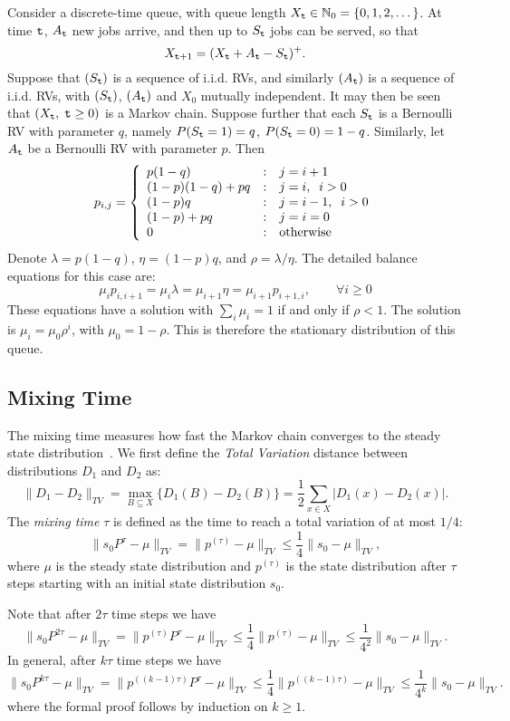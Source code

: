 \begin{example} Consider a discrete-time queue, with queue length $X_{\tt t}\in \mathbb{N}_0=\{0,1,2,\dots\}$. At time  ${\tt t}$, ${A_{\tt t}}$ new jobs arrive, and then up to ${S_{\tt t}}$ jobs can be served, so that
\[{X_{{\tt t} +1}} = {({X_{\tt t}} + {A_{\tt t}} - {S_{\tt t}})^ + }.\]
Suppose that $({S_{\tt t}})$ is a sequence of i.i.d. RVs, and
similarly $({A_{\tt t}})$ is a sequence of i.i.d. RVs, with
$({S_{\tt t}})$, $({A_{\tt t}})$ and ${X_0}$ mutually independent. It
may then be seen that $({X_{\tt t}},\;{\tt t} \ge 0)$ is a Markov chain.
Suppose further that each ${S_{\tt t}}$ is a Bernoulli RV with
parameter $q$, namely $P({S_{\tt t}} = 1) = q$, $P({S_{\tt t}} = 0) =
1 - q$. Similarly, let ${A_{\tt t}}$ be a Bernoulli RV with parameter
$p$. Then
\[{p_{i,j}} = \left\{ {\begin{array}{*{20}{l}}
{p(1 - q)}&:&{j = i + 1}\\
{(1 - p)(1 - q) + pq}&:&{j = i,\;\;i > 0}\\
{(1 - p)q}&:&{j = i - 1,\;\;i > 0}\\
{(1 - p) + pq}&:&{j = i = 0}\\
0&:&{{\rm{otherwise}}}
\end{array}} \right.\]
 Denote $\lambda  = p(1 - q)$, $\eta  = (1 - p)q$, and $\rho  = \lambda /\eta $.   The detailed balance equations for this case are:
\[
\mu_i p_{i,i+1}={\mu _i}\lambda  = {\mu _{i + 1}}\eta=\mu_{i+1}p_{i+1,i} ,\quad \quad \forall i \ge 0\]
These equations have a solution with $\sum_{i}\mu _i = 1$ if and
only if $\rho  < 1$. The solution is ${\mu _i} = {\mu _0}{\rho ^i}$,
with ${\mu _0} = 1 - \rho $. This is therefore the stationary
distribution of this queue.
\end{example}


\subsection{Mixing Time} %
The mixing time measures how fast the Markov chain converges to the steady state distribution~\cite{levin2017markov}. We first define the \emph{Total Variation} distance between distributions $D_1$ and $D_2$ as:
\[
\|D_1-D_2\|_{TV}=\max_{B\subseteq X} \{ D_1(B)-D_2(B) \}
=\frac{1}{2}\sum_{x\in X} | D_1 (x) - D_2(x) |.
\]
The \emph{mixing time} $\tau$ is defined as the time to reach a total variation of at most $1/4$:
\[
\|s_0 P^{\tau}-\mu\|_{TV}=\|p^{(\tau)}-\mu\|_{TV}\leq \frac{1}{4}\| s_0-\mu\|_{TV},
\]
where $\mu$ is the steady state distribution and $p^{(\tau)}$ is the state distribution after $\tau$ steps starting with an initial state distribution $s_0$.

Note that after $2\tau$ time steps we have 
\[
\|s_0 P^{2\tau}-\mu\|_{TV}=\|p^{(\tau)}P^{\tau}-\mu\|_{TV}\leq \frac{1}{4}\| p^{(\tau)}-\mu\|_{TV}\leq \frac{1}{4^2}\| s_0-\mu\|_{TV}.
\]
In general, after $k\tau$ time steps we have 
\[
\|s_0 P^{k\tau}-\mu\|_{TV}=\|p^{((k-1)\tau)}P^{\tau}-\mu\|_{TV}\leq \frac{1}{4}\| p^{((k-1)\tau)}-\mu\|_{TV}\leq \frac{1}{4^k}\| s_0-\mu\|_{TV}.
\]
where the formal proof follows by induction on $k\geq1$.

